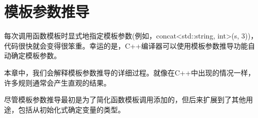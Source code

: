\chapter{模板参数推导}
每次调用函数模板时显式地指定模板参数(例如，concat<std::string, int>(s, 3))，代码很快就会变得很笨重。幸运的是，C++编译器可以使用模板参数推导功能自动确定模板参数。

本章中，我们会解释模板参数推导的详细过程。就像在C++中出现的情况一样，许多规则通常会产生直观的结果。

尽管模板参数推导最初是为了简化函数模板调用添加的，但后来扩展到了其他用途，包括从初始化式确定变量的类型。












